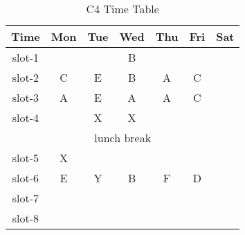 \documentclass{article}
\begin{document}
	\begin{table}[h]
		\centering
		\begin{tabular}{|c|c|c|c|c|c|c|}
			\hline
			\textbf{Time} & \textbf{Mon} & \textbf{Tue} & \textbf{Wed} & \textbf{Thu} & \textbf{Fri} & \textbf{Sat}\\
			\hline
			slot-1 &  &  & \cellcolor{red}B &  &  & \\
			\hline
			slot-2 & \cellcolor{orange!80}C & \cellcolor{yellow}E & \cellcolor{red}B & \cellcolor{blue!35}A & \cellcolor{orange!80}C & \\
			\hline
			slot-3 & \cellcolor{blue!35}A & \cellcolor{yellow}E & \cellcolor{blue!35}A & \cellcolor{blue!35}A & \cellcolor{orange!80}C & \\
			\hline
			slot-4 &  & \cellcolor{green}X & \cellcolor{green}X &  &  & \\
			\hline
			 \multicolumn{7}{|c|}{lunch break} \\
			\hline
			slot-5 & \cellcolor{green}X & \cellcolor{blue!20} &\cellcolor{red} &\cellcolor{yellow}  &\cellcolor{
				blue!80}  & \\			\cline{1-2} \cline{7-1}
			slot-6 & \cellcolor{yellow}E &\cellcolor{blue!20} Y &\cellcolor{red} B &\cellcolor{yellow} F &\cellcolor{
			blue!80} D & \\
			\cline{1-2} \cline{7-1}
			slot-7 &  &\cellcolor{blue!20}  &\cellcolor{red}  &\cellcolor{yellow}  &\cellcolor{
				blue!80} & \\
			\hline
			slot-8 &  &  &  &  & & \\
			\hline
			
			
			
		\end{tabular}
	\caption{C4 Time Table}
	\label{tab:example}
	
	\end{table}
\end{document}
